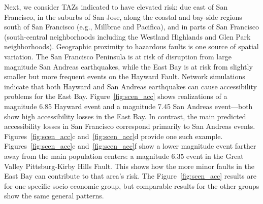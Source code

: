 



Next, we consider TAZs indicated to have elevated risk: due east of San Francisco, in the suburbs of San Jose, along the coastal and bay-side regions south of San Francisco (e.g., Millbrae and Pacifica), and in parts of San Francisco (south-central neighborhoods including the Westland Highlands and Glen Park neighborhoods). Geographic proximity to hazardous faults is one source of spatial variation. The San Francisco Peninsula is at risk of disruption from large magnitude San Andreas earthquakes, while the East Bay is at risk from slightly smaller but more frequent events on the Hayward Fault. Network simulations indicate that both Hayward and San Andreas earthquakes can cause accessibility problems for the East Bay. Figure~\ref{fig:scen_acc} shows realizations of a magnitude 6.85 Hayward event and a magnitude 7.45 San Andreas event---both show high accessibility losses in the East Bay.
In contrast, the main predicted accessibility losses in San Francisco correspond primarily to San Andreas events.
Figures~\ref{fig:scen_acc}{c} and~\ref{fig:scen_acc}{d} provide one such example. Figures~\ref{fig:scen_acc}{e} and~\ref{fig:scen_acc}{f} show a lower magnitude event farther away from the main population centers: a magnitude 6.35 event in the Great Valley Pittsburg-Kirby Hills Fault. This shows how the more minor faults in the East Bay can contribute to that area's risk.
The Figure~\ref{fig:scen_acc} results are for one specific socio-economic group, but comparable results for the other groups show the same general patterns.


